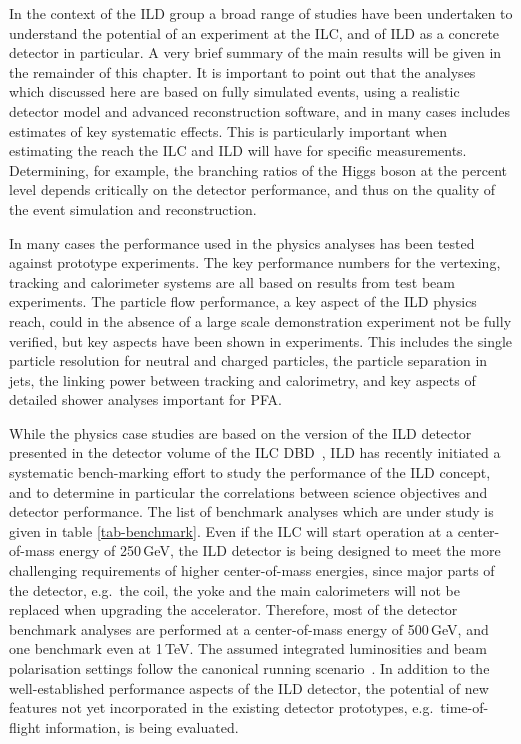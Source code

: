 In the context of the ILD group a broad range of studies have been undertaken to understand the potential of an experiment at the ILC, and of ILD as a concrete detector in particular. A very brief summary of the main results will be given in the remainder of this chapter. It is important to point out that 
 the analyses which discussed here are based on fully simulated events, using a realistic detector model and advanced reconstruction software, and in many cases includes estimates of key systematic effects. This is particularly important when estimating the reach the ILC and ILD will have for specific measurements. Determining, for example, the branching ratios of the Higgs boson at the percent level depends critically on the detector performance, and thus on the quality of the event simulation and reconstruction. 

In many cases the performance used in the physics analyses has been tested against prototype experiments. The key performance numbers for the vertexing, tracking and calorimeter systems are all based on results from test beam experiments. The particle flow performance, a key aspect of the ILD physics reach, could in the absence of a large scale demonstration experiment not be fully verified, but key aspects have been shown in experiments. This includes the single particle resolution for neutral and charged particles, the particle separation in jets, the linking power between tracking and calorimetry, and key aspects of detailed shower analyses important for PFA. 

While the physics case studies are based on the version of the ILD detector presented in the detector volume of the ILC DBD~\cite{Behnke:2013lya}, ILD has recently initiated a systematic bench-marking effort to study the performance of the ILD concept, and to determine in particular the correlations between science objectives and detector performance. The list of benchmark analyses which are under study is given in table \ref{tab-benchmark}. Even if the ILC will start operation at a center-of-mass energy of 250\,GeV, the ILD detector is being designed to meet the more challenging requirements of higher center-of-mass energies, since major parts of the detector, e.g.\ the coil, the yoke and the main calorimeters will not be replaced when upgrading the accelerator. Therefore, most of the detector benchmark analyses are performed at a center-of-mass energy of 500\,GeV, and one benchmark even at 1\,TeV. The assumed integrated luminosities and beam polarisation settings follow the canonical running scenario~\cite{Barklow:2015tja}. 
In addition to the well-established performance aspects of the ILD detector, the potential of new features not yet incorporated in the existing detector prototypes, e.g.\ time-of-flight information, is being evaluated. 
